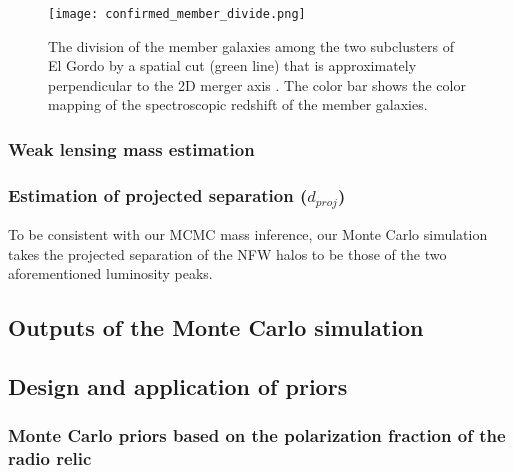 \begin{figure}
	\texttt{[image: confirmed\_member\_divide.png]}
	\caption{\label{fig:membership} The division of
the member galaxies among the two subclusters of El Gordo by a spatial cut
(green line) that is approximately perpendicular to the 2D merger axis
. The color bar shows the color mapping of the spectroscopic redshift of the
member galaxies.} 
\end{figure}

\subsubsection{Weak lensing mass estimation} 



\subsubsection{Estimation of projected separation ($d_{proj}$) } 
To be consistent with our MCMC mass inference, our Monte Carlo simulation takes 
the projected separation of the NFW halos to be those of the two aforementioned 
luminosity peaks.

\subsection{Outputs of the Monte Carlo simulation}
\label{sec: outputs}


\subsection{Design and application of priors} 
\label{sec:priors}


\subsubsection{Monte Carlo priors based on the polarization fraction of the radio relic}


